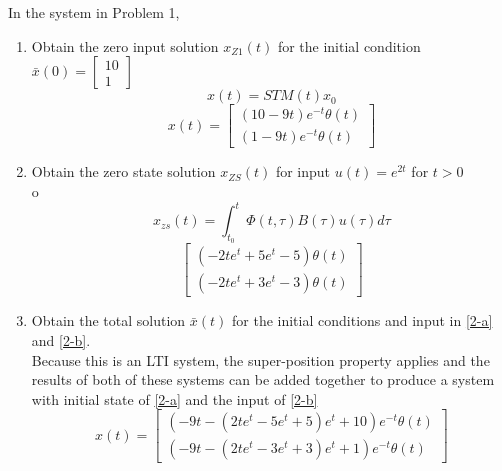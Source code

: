\item In the system in Problem 1,
  \begin{enumerate}
  \item Obtain the zero input solution $x_{Z1}(t)$ for the initial condition
    $\bar x(0) = \begin{bmatrix}
10\\
1
\end{bmatrix}
$ \label{2-a} \\
    \begin{equation}
x(t) = STM(t)x_0\end{equation}
\begin{equation}
x(t) =\left[\begin{matrix}\left(10 - 9 t\right) e^{- t} \theta\left(t\right)\\\left(1 - 9 t\right) e^{- t} \theta\left(t\right)\end{matrix}\right]\end{equation}

  \item Obtain the zero state solution $x_{ZS}(t)$ for input $u(t) = e^{2t}$ for $t > 0$ \label{2-b}\\o
    \begin{equation}
x_{zs}(t) = \int_{t_0}^t \Phi(t,\tau)B(\tau)u(\tau)d\tau\end{equation}
\begin{equation}
\left[\begin{matrix}\left(- 2 t e^{t} + 5 e^{t} - 5\right) \theta\left(t\right)\\\left(- 2 t e^{t} + 3 e^{t} - 3\right) \theta\left(t\right)\end{matrix}\right]\end{equation}

  \item Obtain the total solution $\bar x(t)$ for the initial conditions and input in \ref{2-a} and
    \ref{2-b}.\\
    
    Because this is an LTI system, the super-position property applies and the results of both of these systems
    can be added together to produce a system with initial state of \ref{2-a} and the input of \ref{2-b}
    \begin{equation}
x(t) = \left[\begin{matrix}\left(- 9 t - \left(2 t e^{t} - 5 e^{t} + 5\right) e^{t} + 10\right) e^{- t} \theta\left(t\right)\\\left(- 9 t - \left(2 t e^{t} - 3 e^{t} + 3\right) e^{t} + 1\right) e^{- t} \theta\left(t\right)\end{matrix}\right]\end{equation}

    
  \end{enumerate}